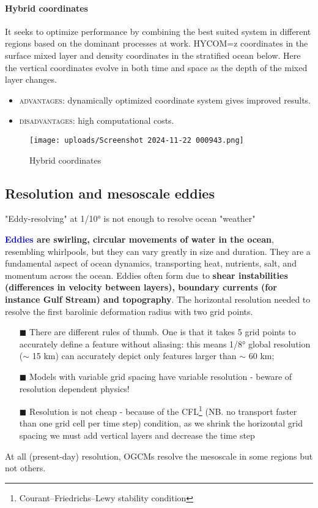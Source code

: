 \paragraph{Hybrid coordinates} It seeks to optimize performance by combining the best suited system in different regions based on the dominant processes at work. HYCOM=z coordinates in the surface mixed layer and density coordinates in the stratified ocean below. Here the vertical coordinates evolve in both time and space as the depth of the mixed layer changes.
\begin{itemize}
	\item \textsc{advantages}: dynamically optimized coordinate system gives improved results.
	\item\textsc{disadvantages}: high computational costs.
\end{itemize}

\begin{figure}[htp!]
	\centering
	\texttt{[image: uploads/Screenshot 2024-11-22 000943.png]}
	\caption{Hybrid coordinates}

\end{figure}
\subsection{Resolution and mesoscale eddies}
\begin{center}
	"Eddy-resolving" at 1/10° is not enough to resolve ocean "weather"
\end{center}
\textbf{\textcolor{Blue}{Eddies} are swirling, circular movements of water in the ocean}, resembling whirlpools, but they can vary greatly in size and duration. They are a fundamental aspect of ocean dynamics, transporting heat, nutrients, salt, and momentum across the ocean. Eddies often form due to \textbf{shear instabilities (differences in velocity between layers), boundary currents (for instance Gulf Stream) and topography}.
The horizontal resolution needed to resolve the first barolinic deformation radius with two grid points.
\begin{itemize}
	\item[$\blacksquare$] There are different rules of thumb. One is that it takes 5 grid points to accurately define a feature without aliasing: this means 1/8° global resolution ($\sim$ 15 km) can accurately depict only features larger than $\sim$ 60 km;
	\item[$\blacksquare$] Models with variable grid spacing have variable resolution - beware of resolution dependent physics!
	\item[$\blacksquare$] Resolution is not cheap - because of the CFL\footnote{Courant–Friedrichs–Lewy stability condition} (NB. no transport faster than one grid cell per time step) condition, as we shrink the horizontal grid spacing we must add vertical layers and decrease the time step
\end{itemize}
At all (present-day) resolution, OGCMs resolve the mesoscale in some regions but not others. \\



